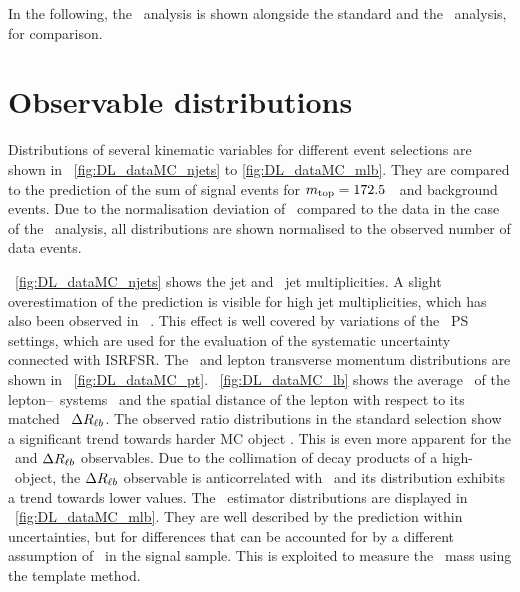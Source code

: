 %




%
In the following, the \mvabased\ analysis is shown alongside the standard and the \cutbased\ analysis, for comparison.
















\section{Observable distributions}
\label{sect:distr}
%
Distributions of several kinematic variables for different event selections are shown in ~\ref{fig:DL_dataMC_njets} to \ref{fig:DL_dataMC_mlb}. They are compared to the prediction of the sum of signal events for $m_{\mathrm{top}}=172.5$~\GeV\ and background events. Due to the normalisation deviation of \DLevtexcopti\ compared to the data in the case of the \cutbased\ analysis, all distributions are shown normalised to the observed number of data events.


\Fig~\ref{fig:DL_dataMC_njets} shows the jet and \btagged\ jet multiplicities.
%
A slight overestimation of the prediction is visible for high jet multiplicities, which has also been observed in ~\cite{ATLASCollaboration2014a}. This effect is well covered by variations of the \Acermc\ \gls{PS} settings, which are used for the evaluation of the systematic uncertainty connected with \gls{ISRFSR}.
%
%
The \bjet\ and lepton transverse momentum distributions are shown in \fig~\ref{fig:DL_dataMC_pt}.
%
\Fig~\ref{fig:DL_dataMC_lb} shows the average \pt\ of the lepton--\bjet\ systems \ptlb\ and the spatial distance of the lepton with respect to its matched \bjet\ $\Delta R_{\ell b}$. 
%
The observed ratio distributions in the standard selection show a significant trend towards harder \gls{MC} object \pt. This is even more apparent for the \ptlb\ and $\Delta R_{\ell b}$ observables. Due to the collimation of decay products of a high-\pt\ object, the $\Delta R_{\ell b}$ observable is anticorrelated with \ptlb\ and its distribution exhibits a trend towards lower values. 
%
%
The \mlbr\ estimator distributions are displayed in \fig~\ref{fig:DL_dataMC_mlb}.
They are well described by the prediction within uncertainties, but for differences that can be accounted for by a different assumption of \mt\ in the signal sample.
%
This is exploited to measure the \tquark\ mass using the template method.


